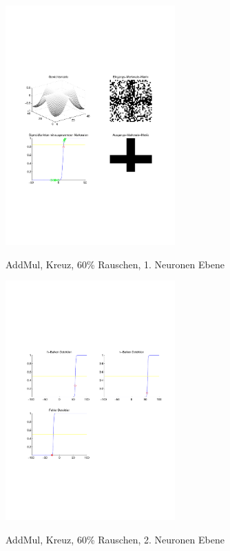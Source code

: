 \begin{figure}[hbt]
	\begin{minipage}[c]{\textwidth}
		\centering
       	\includegraphics[trim=71 213 43 212, clip, width=0.58\textwidth]{./Bilder/Auswertung/Endergebnis/TypeAddMul_Rauschen60_Cross_Layer1}
		\caption{AddMul, Kreuz, 60\% Rauschen, 1. Neuronen Ebene}
		\label{AddMul_Kreuz_60_1}
		\vfill
		\includegraphics[trim=71 213 43 212, clip, width=0.58\textwidth]{./Bilder/Auswertung/Endergebnis/TypeAddMul_Rauschen60_Cross_Layer2}
		\caption{AddMul, Kreuz, 60\% Rauschen, 2. Neuronen Ebene}
		\label{AddMul_Kreuz_60_2}
	\end{minipage}
\end{figure}

